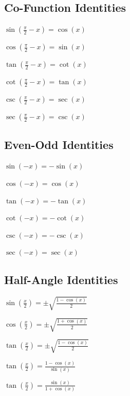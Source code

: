 \subsection*{Co-Function Identities}	
\begin{eqlist}
	\item $\sin\left(\frac{\pi}{2}-x\right) = \cos(x)$
	\item $\cos\left(\frac{\pi}{2}-x\right) = \sin(x)$
	\item $\tan\left(\frac{\pi}{2}-x\right) = \cot(x)$
	\item $\cot\left(\frac{\pi}{2}-x\right) = \tan(x)$
	\item $\csc\left(\frac{\pi}{2}-x\right) = \sec(x)$	
	\item $\sec\left(\frac{\pi}{2}-x\right) = \csc(x)$
\end{eqlist}

\subsection*{Even-Odd Identities}	
\begin{eqlist}
	\item $\sin(-x) = -\sin(x)$
	\item $\cos(-x) = \cos(x)$
	\item $\tan(-x) = -\tan(x)$
	\item $\cot(-x) = -\cot(x)$
	\item $\csc(-x) = -\csc(x)$
	\item $\sec(-x) = \sec(x)$
\end{eqlist}

\subsection*{Half-Angle Identities}	
\begin{eqlist}
	\item $\sin\left(\frac{x}{2}\right) = \pm\sqrt{\frac{1-\cos(x)}{2}}$
	\item $\cos\left(\frac{x}{2}\right) = \pm\sqrt{\frac{1+\cos(x)}{2}}$
	\item $\tan\left(\frac{x}{2}\right) = \pm\sqrt{\frac{1-\cos(x)}{2}}$
	\item $\tan\left(\frac{x}{2}\right) = \frac{1-\cos(x)}{\sin(x)}$
	\item $\tan\left(\frac{x}{2}\right) = \frac{\sin(x)}{1+\cos(x)}$
\end{eqlist}

